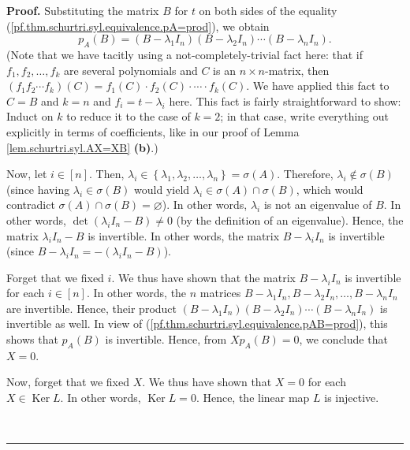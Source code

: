 \documentclass[numbers=enddot,12pt,final,onecolumn,notitlepage]{scrartcl}%
\numberwithin{exer}{subsection}
\theoremstyle{definition}
\newenvironment{proof}[1][Proof]{\noindent\textbf{#1.} }{\ \rule{0.5em}{0.5em}}
\begin{document}
\begin{proof}
Substituting the matrix $B$ for $t$ on both sides of the equality
(\ref{pf.thm.schurtri.syl.equivalence.pA=prod}), we obtain%
\begin{equation}
p_{A}\left(  B\right)  =\left(  B-\lambda_{1}I_{n}\right)  \left(
B-\lambda_{2}I_{n}\right)  \cdots\left(  B-\lambda_{n}I_{n}\right)  .
\label{pf.thm.schurtri.syl.equivalence.pAB=prod}%
\end{equation}
(Note that we have tacitly using a not-completely-trivial fact here: that if
$f_{1},f_{2},\ldots,f_{k}$ are several polynomials and $C$ is an $n\times
n$-matrix, then $\left(  f_{1}f_{2}\cdots f_{k}\right)  \left(  C\right)
=f_{1}\left(  C\right)  \cdot f_{2}\left(  C\right)  \cdot\cdots\cdot
f_{k}\left(  C\right)  $. We have applied this fact to $C=B$ and $k=n$ and
$f_{i}=t-\lambda_{i}$ here. This fact is fairly straightforward to show:
Induct on $k$ to reduce it to the case of $k=2$; in that case, write
everything out explicitly in terms of coefficients, like in our proof of Lemma
\ref{lem.schurtri.syl.AX=XB} \textbf{(b)}.)

Now, let $i\in\left[  n\right]  $. Then, $\lambda_{i}\in\left\{  \lambda
_{1},\lambda_{2},\ldots,\lambda_{n}\right\}  =\sigma\left(  A\right)  $.
Therefore, $\lambda_{i}\notin\sigma\left(  B\right)  $ (since having
$\lambda_{i}\in\sigma\left(  B\right)  $ would yield $\lambda_{i}\in
\sigma\left(  A\right)  \cap\sigma\left(  B\right)  $, which would contradict
$\sigma\left(  A\right)  \cap\sigma\left(  B\right)  =\varnothing$). In other
words, $\lambda_{i}$ is not an eigenvalue of $B$. In other words, $\det\left(
\lambda_{i}I_{n}-B\right)  \neq0$ (by the definition of an eigenvalue). Hence,
the matrix $\lambda_{i}I_{n}-B$ is invertible. In other words, the matrix
$B-\lambda_{i}I_{n}$ is invertible (since $B-\lambda_{i}I_{n}=-\left(
\lambda_{i}I_{n}-B\right)  $).

Forget that we fixed $i$. We thus have shown that the matrix $B-\lambda
_{i}I_{n}$ is invertible for each $i\in\left[  n\right]  $. In other words,
the $n$ matrices $B-\lambda_{1}I_{n},B-\lambda_{2}I_{n},\ldots,B-\lambda
_{n}I_{n}$ are invertible. Hence, their product $\left(  B-\lambda_{1}%
I_{n}\right)  \left(  B-\lambda_{2}I_{n}\right)  \cdots\left(  B-\lambda
_{n}I_{n}\right)  $ is invertible as well. In view of
(\ref{pf.thm.schurtri.syl.equivalence.pAB=prod}), this shows that
$p_{A}\left(  B\right)  $ is invertible. Hence, from $Xp_{A}\left(  B\right)
=0$, we conclude that $X=0$.

Now, forget that we fixed $X$. We thus have shown that $X=0$ for each
$X\in\operatorname*{Ker}L$. In other words, $\operatorname*{Ker}L=0$. Hence,
the linear map $L$ is injective.


\end{proof}
\end{document}

